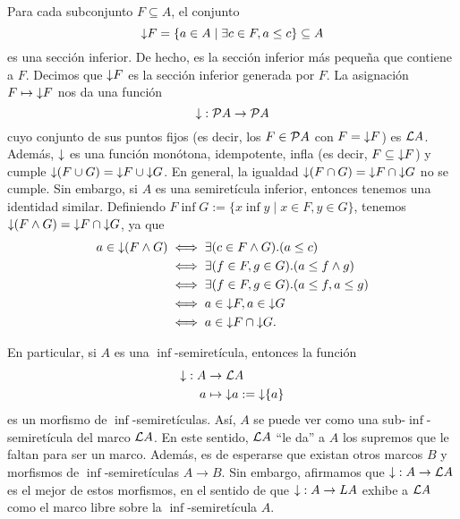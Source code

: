 Para cada subconjunto $F\subseteq A$, el conjunto
\[
  \down F = \{a\in A \mid \exists c\in F , a\leq c\} \subseteq A
\]
es una sección inferior.
De hecho, es la sección inferior más pequeña que contiene a $F$.
Decimos que $\down F$ es la sección inferior generada por $F$.
La asignación $F\mapsto\down F$ nos da una función
\[
  \down:\cal PA\to\cal PA
\]
cuyo conjunto de sus puntos fijos
(es decir, los $F\in\cal PA$ con $F=\down F$) es $\cal LA$.
Además, $\down$ es una función monótona, idempotente, infla
(es decir, $F\subseteq\down F$) y cumple $\down(F\cup G)=\down
F\cup\down G$.
En general, la igualdad $\down(F\cap G)=\down F\cap\down G$ no se
cumple. Sin embargo, si $A$ es una semiretícula inferior,
entonces tenemos una identidad similar.
Definiendo $F\inf G := \{x\inf y \mid x\in F, y\in G\}$,
tenemos $\down(F\inf G)= \down F\cap\down G$, ya que
\begin{align*}
  a\in\down(F\inf G)
  &\iff \exists(c\in F\inf G).(a\leq c) \\
  &\iff \exists(f\in F,g\in G).(a\leq f\inf g) \\
  &\iff \exists(f\in F,g\in G).(a\leq f, a\leq g) \\
  &\iff a\in \down F, a\in \down G \\
  &\iff a\in \down F\cap\down G.
\end{align*}

En particular, si $A$ es una $\inf$-semiretícula,
entonces la función
\begin{align*}
    \down : A&\to \cal LA \\
    a&\mapsto \down a:=\down\{a\}
\end{align*}
es un morfismo de $\inf$-semiretículas.
Así, $A$ se puede ver como una sub-$\inf$-semiretícula del marco
$\cal LA$.
En este sentido, $\cal LA$ ``le da'' a $A$ los supremos que le
faltan para ser un marco.
Además, es de esperarse que existan otros marcos $B$ y morfismos
de $\inf$-semiretículas $A\to B$. Sin embargo, afirmamos que
$\down:A\to\cal LA$ es el mejor de estos morfismos, en el sentido
de que $\down:A\to LA$ exhibe a $\cal LA$ como el marco libre
sobre la $\inf$-semiretícula $A$.

